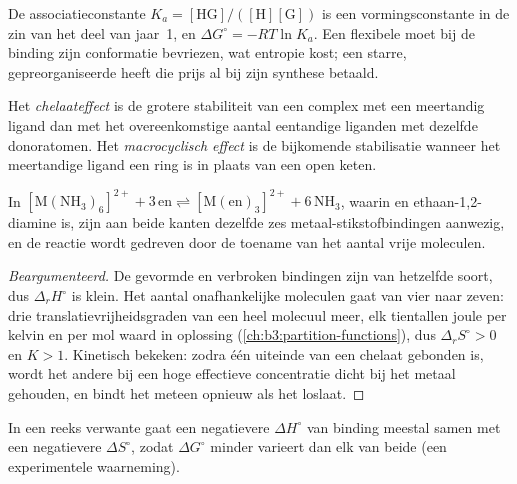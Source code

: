De associatieconstante $K_a = [\mathrm{HG}]/([\mathrm H][\mathrm G])$ is een vormingsconstante in de zin van
het deel van jaar~1, en $\Delta G^\circ = -RT\ln K_a$. Een flexibele  moet bij de
binding zijn conformatie bevriezen, wat entropie kost; een starre,
gepreorganiseerde  heeft die prijs al bij zijn synthese betaald.

\begin{definition}\label{def:b3:supramolecular:macrocyclic}
Het \emph{chelaateffect} is de grotere stabiliteit van
een complex met een meertandig ligand dan met het overeenkomstige aantal
eentandige liganden met dezelfde donoratomen. Het
\emph{macrocyclisch effect} is de bijkomende
stabilisatie wanneer het meertandige ligand een ring is in plaats van een
open keten.
\end{definition}

\begin{proposition}\label{prop:b3:supramolecular:chelate-entropy}
In $\mathrm{[M(NH_3)_6]^{2+} + 3\,en \rightleftharpoons [M(en)_3]^{2+} + 6\,NH_3}$, waarin en ethaan-1,2-diamine is, zijn aan beide kanten
dezelfde zes metaal-stikstofbindingen aanwezig, en de reactie wordt
gedreven door de toename van het aantal vrije moleculen.
\end{proposition}

\begin{proof}[Beargumenteerd]
De gevormde en verbroken bindingen zijn van hetzelfde soort, dus $\Delta_rH^\circ$ is klein. Het aantal
onafhankelijke moleculen gaat van vier naar zeven: drie translatievrijheidsgraden
van een heel molecuul meer, elk tientallen joule per kelvin
en per mol waard in oplossing (\cref{ch:b3:partition-functions}), dus $\Delta_rS^\circ > 0$ en $K > 1$.
Kinetisch bekeken: zodra één uiteinde van een chelaat gebonden is, wordt
het andere bij een hoge effectieve concentratie dicht bij het metaal
gehouden, en bindt het meteen opnieuw als het loslaat.
\end{proof}

\begin{proposition}\label{prop:b3:supramolecular:compensation}
In een reeks verwante  gaat een negatievere $\Delta H^\circ$ van binding
meestal samen met een negatievere $\Delta S^\circ$, zodat $\Delta G^\circ$ minder varieert dan elk van beide (een
experimentele waarneming).
\end{proposition}

